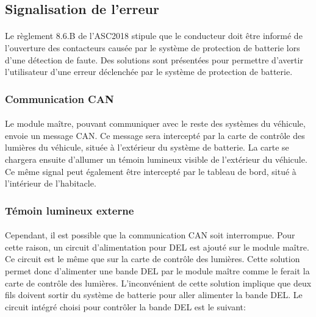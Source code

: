 
\subsection{Signalisation de l'erreur}

	\paragraph*{}
	Le règlement 8.6.B de l'ASC2018\cite{ASC2018} stipule que le conducteur doit être informé de l'ouverture des contacteurs causée par le système de protection de  batterie lors d'une détection de faute. Des solutions sont présentées pour permettre d'avertir l'utilisateur d'une erreur déclenchée par le système de protection de batterie. 
	
	\subsubsection{Communication CAN}
		\paragraph*{}
		Le module maître, pouvant communiquer avec le reste des systèmes du véhicule, envoie un message CAN. Ce message sera intercepté par la carte de contrôle des lumières du véhicule, située à l'extérieur du système de batterie. La carte se chargera ensuite d'allumer un témoin lumineux visible de l'extérieur du véhicule. Ce même signal peut également être intercepté par le tableau de bord, situé à l'intérieur de l'habitacle.
		
	\subsubsection{Témoin lumineux externe}
		\paragraph*{}
		Cependant, il est possible que la communication CAN soit interrompue. Pour cette raison, un circuit d'alimentation pour DEL est ajouté sur le module maître. Ce circuit est le même que sur la carte de contrôle des lumières. Cette solution permet donc d'alimenter une bande DEL par le module maître comme le ferait la carte de contrôle des lumières. L'inconvénient de cette solution implique que deux fils doivent sortir du système de batterie pour aller alimenter la bande DEL. Le circuit intégré choisi pour contrôler la bande DEL est le suivant:
	
